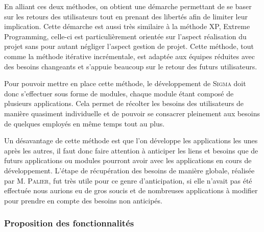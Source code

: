En alliant ces deux méthodes, on obtient une démarche permettant de se baser sur les retours des utilisateurs tout en prenant des libertés afin de limiter leur implication.
Cette démarche est aussi très similaire à la méthode XP, Extreme Programming, celle-ci est particulièrement orientée sur l'aspect réalisation du projet sans pour autant négliger l'aspect gestion de projet.
Cette méthode, tout comme la méthode itérative incrémentale, est adaptée aux équipes réduites avec des besoins changeants et s'appuie beaucoup sur le retour des futurs utilisateurs.

Pour pouvoir mettre en place cette méthode, le développement de \textsc{Sigma} doit donc s'effectuer sous forme de modules, chaque module étant composé de plusieurs applications.
Cela permet de récolter les besoins des utilisateurs de manière quasiment individuelle et de pouvoir se consacrer pleinement aux besoins de quelques employés en même temps tout au plus.

Un désavantage de cette méthode est que l'on développe les applications les unes après les autres, il faut donc faire attention à anticiper les liens et besoins que de futurs applications ou modules pourront avoir avec les applications en cours de développement.
L'étape de récupération des besoins de manière globale, réalisée par M. \textsc{Palier}, fut très utile pour ce genre d'anticipation, si elle n'avait pas été effectuée nous aurions eu de gros soucis et de nombreuses applications à modifier pour prendre en compte des besoins non anticipés.

\subsubsection{Proposition des fonctionnalités}

